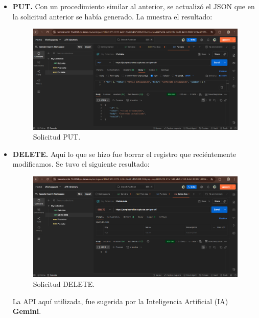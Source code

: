 \documentclass[12pt,a4paper]{article}
\begin{document}
\begin{itemize}
  \item \textbf{PUT.}
  Con un procedimiento similar al anterior, se actualizó el JSON que en la solicitud anterior se había generado. La  
  muestra el resultado:

  \begin{figure}[H]
    \centering
    \includegraphics[width=\textwidth]{put.png}
    \caption{Solicitud PUT.}
    \label{fig:put}
  \end{figure}

  \item \textbf{DELETE.}
  Aquí lo que se hizo fue borrar el registro que reciéntemente modificamos. Se tuvo el siguiente resultado:

  \begin{figure}[H]
    \centering
    \includegraphics[width=\textwidth]{delete.png}
    \caption{Solicitud DELETE.}
    \label{fig:delete}
  \end{figure}

  La API aquí utilizada, fue sugerida por la Inteligencia Artificial (IA) \textbf{Gemini}.
\end{itemize}
\end{document}
